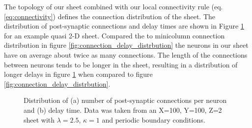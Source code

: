 The topology of our sheet combined with our local connectivity rule (eq. \ref{eq:connectivity}) defines the connection distribution of the sheet.
The distribution of post-synaptic connections and delay times are shown in Figure \ref{fig:connection_delay_distrbution_2D} for an example quasi 2-D sheet.
Compared the to minicolumn connection distribution in figure \ref{fig:connection_delay_distrbution} the neurons in our sheet have on average about twice as many connections.
The length of the connections between neurons tends to be longer in the sheet, resulting in a distribution of longer delays 
in figure \ref{fig:connection_delay_distrbution_2D} when compared to figure \ref{fig:connection_delay_distrbution}.
\begin{figure}[!htb]
 \caption{Distribution of (a) number of post-synaptic connections per neuron and (b) delay time. 
          Data was taken from an X=100, Y=100, Z=2 sheet with $\lambda=2.5$, $\kappa=1$ and periodic boundary conditions.  } 
 \label{fig:connection_delay_distrbution_2D}
\end{figure}
 \FloatBarrier

